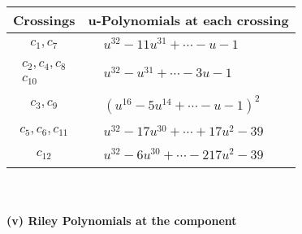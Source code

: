 \documentclass[1p]{elsarticle_modified}
\theoremstyle{definition}
\begin{document}
\begin{tabular}{m{50pt}|m{274pt}}
Crossings & \hspace{64pt}u-Polynomials at each crossing \\
\hline $$\begin{aligned}c_{1},c_{7}\end{aligned}$$&$\begin{aligned}
&u^{32}-11 u^{31}+\cdots- u-1
\end{aligned}$\\
\hline $$\begin{aligned}c_{2},c_{4},c_{8}\\c_{10}\end{aligned}$$&$\begin{aligned}
&u^{32}- u^{31}+\cdots-3 u-1
\end{aligned}$\\
\hline $$\begin{aligned}c_{3},c_{9}\end{aligned}$$&$\begin{aligned}
&(u^{16}-5 u^{14}+\cdots- u-1)^{2}
\end{aligned}$\\
\hline $$\begin{aligned}c_{5},c_{6},c_{11}\end{aligned}$$&$\begin{aligned}
&u^{32}-17 u^{30}+\cdots+17 u^2-39
\end{aligned}$\\
\hline $$\begin{aligned}c_{12}\end{aligned}$$&$\begin{aligned}
&u^{32}-6 u^{30}+\cdots-217 u^2-39
\end{aligned}$\\
\hline
\end{tabular}\\~\\
\newpage\renewcommand{\arraystretch}{1}
\flushleft \textbf{(v) Riley Polynomials at the component}\newline \\
\end{document}
